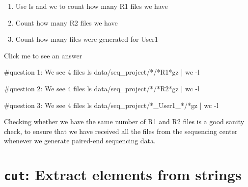 \documentclass[
  letterpaper,
  DIV=11,
  numbers=noendperiod]{scrreprt}
\newenvironment{Shaded}{}{}
\newcommand{\AttributeTok}[1]{\textcolor[rgb]{0.84,0.23,0.29}{#1}}
\newcommand{\CommentTok}[1]{\textcolor[rgb]{0.42,0.45,0.49}{#1}}
\newcommand{\FunctionTok}[1]{\textcolor[rgb]{0.44,0.26,0.76}{#1}}
\newcommand{\KeywordTok}[1]{\textcolor[rgb]{0.84,0.23,0.29}{#1}}
\newcommand{\NormalTok}[1]{\textcolor[rgb]{0.14,0.16,0.18}{#1}}
\newcommand{\PreprocessorTok}[1]{\textcolor[rgb]{0.84,0.23,0.29}{#1}}
\providecommand{\tightlist}{%
  \setlength{\itemsep}{0pt}\setlength{\parskip}{0pt}}\usepackage{longtable,booktabs,array}
\begin{document}
\begin{tcolorbox}[enhanced jigsaw, title=\textcolor{quarto-callout-caution-color}{\faFire}\hspace{0.5em}{Exercise}, colframe=quarto-callout-caution-color-frame, opacitybacktitle=0.6, rightrule=.15mm, arc=.35mm, left=2mm, colbacktitle=quarto-callout-caution-color!10!white, bottomrule=.15mm, leftrule=.75mm, toprule=.15mm, opacityback=0, bottomtitle=1mm, colback=white, toptitle=1mm, breakable, titlerule=0mm, coltitle=black]

\begin{enumerate}
\def\labelenumi{\arabic{enumi}.}
\tightlist
\item
  Use ls and wc to count how many R1 files we have
\item
  Count how many R2 files we have
\item
  Count how many files were generated for User1
\end{enumerate}

Click me to see an answer

\begin{Shaded}
\begin{Highlighting}[]
\CommentTok{\#question 1: We see 4 files}
\FunctionTok{ls}\NormalTok{ data/seq\_project/}\PreprocessorTok{*}\NormalTok{/}\PreprocessorTok{*}\NormalTok{R1}\PreprocessorTok{*}\NormalTok{gz }\KeywordTok{|} \FunctionTok{wc} \AttributeTok{{-}l} 

\CommentTok{\#question 2: We see 4 files}
\FunctionTok{ls}\NormalTok{ data/seq\_project/}\PreprocessorTok{*}\NormalTok{/}\PreprocessorTok{*}\NormalTok{R2}\PreprocessorTok{*}\NormalTok{gz }\KeywordTok{|} \FunctionTok{wc} \AttributeTok{{-}l} 

\CommentTok{\#question 3: We see 4 files}
\FunctionTok{ls}\NormalTok{ data/seq\_project/}\PreprocessorTok{*}\NormalTok{\_User1\_}\PreprocessorTok{*}\NormalTok{/}\PreprocessorTok{*}\NormalTok{gz }\KeywordTok{|} \FunctionTok{wc} \AttributeTok{{-}l} 
\end{Highlighting}
\end{Shaded}

Checking whether we have the same number of R1 and R2 files is a good
sanity check, to ensure that we have received all the files from the
sequencing center whenever we generate paired-end sequencing data.

\end{tcolorbox}

\section{\texorpdfstring{\texttt{cut}: Extract elements from
strings}{cut: Extract elements from strings}}\label{cut-extract-elements-from-strings}
\end{document}
